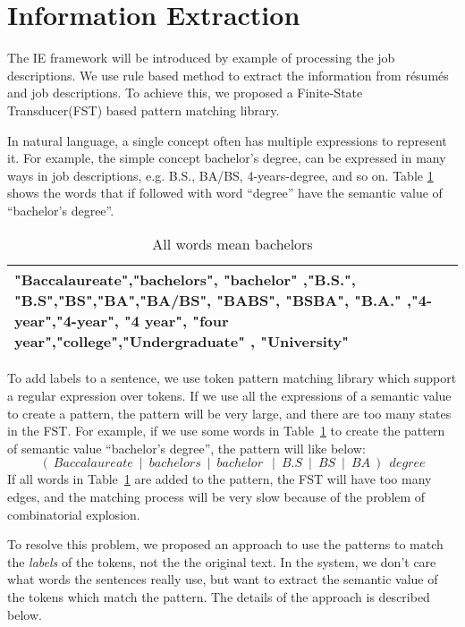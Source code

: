 
\section{Information Extraction}
\label{sec1}

The IE framework will be introduced by example of processing the job descriptions. We use rule based method to extract the information from r\'esum\'es and job descriptions. To achieve this, we proposed  a Finite-State Transducer(FST) based pattern matching library.

In natural language, a single concept often has multiple expressions to represent it. For example, the simple concept bachelor's degree,  can be expressed in many ways in job descriptions, e.g. B.S., BA/BS, 4-years-degree, and so on. Table \ref{tab:multispelling} shows the words that if followed with word ``degree'' have the semantic value of ``bachelor's degree''.

\begin{table}[ht]
\caption{All words mean bachelors} %
\centering %
\begin{tabular}{  | p{15cm} |  }
 \hline
 "Baccalaureate","bachelors", "bachelor" ,"B.S.", "B.S","BS","BA","BA/BS", "BABS", "BSBA", "B.A." ,"4-year","4-year", "4 year", "four year","college","Undergraduate" , "University" \\
  \hline
\end{tabular}
\label{tab:multispelling} %
\end{table}

To add labels to a sentence, we use token pattern matching library which support a regular expression over tokens. If we use all the expressions of a semantic value to create a pattern, the pattern will be very large, and there are too many states in the FST. For example, if we use some words in Table~\ref{tab:multispelling} to create the pattern of semantic value ``bachelor's degree'', the pattern will like below:
$$ (~Baccalaureate~\mid~bachelors~\mid~bachelor~~\mid~B.S~\mid~BS~\mid~BA~)~~degree $$
If all words in Table~\ref{tab:multispelling} are added to the pattern, the FST will have too many edges, and the matching process will be very slow because of the problem of combinatorial explosion.

To resolve this problem, we proposed an approach to use the patterns to match the \textit{labels} of the tokens, not the the original text. In the system, we don't care what words the sentences really use, but want to extract the semantic value of the tokens which match the pattern. The details of the approach is described below.


